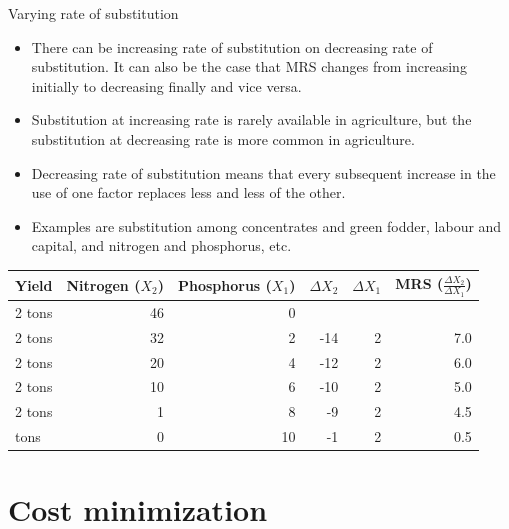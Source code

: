 \documentclass[12pt,ignorenonframetext,aspectratio=169]{beamer}
\providecommand{\tightlist}{%
  \setlength{\itemsep}{0pt}\setlength{\parskip}{0pt}}
\begin{document}
\begin{frame}{Varying rate of substitution}
\protect\hypertarget{varying-rate-of-substitution}{}
\begin{itemize}
\tightlist
\item
  There can be increasing rate of substitution on decreasing rate of
  substitution. It can also be the case that MRS changes from increasing
  initially to decreasing finally and vice versa.
\item
  Substitution at increasing rate is rarely available in agriculture,
  but the substitution at decreasing rate is more common in agriculture.
\item
  Decreasing rate of substitution means that every subsequent increase
  in the use of one factor replaces less and less of the other.
\item
  Examples are substitution among concentrates and green fodder, labour
  and capital, and nitrogen and phosphorus, etc.
\end{itemize}
\end{frame}

\begin{frame}{}
\protect\hypertarget{section-7}{}
\begin{table}[H]
\centering
\begin{tabular}{lrrrrr}
\toprule
Yield & Nitrogen ($X_2$) & Phosphorus ($X_1$) & $\Delta X_2$ & $\Delta X_1$ & MRS ($\frac{\Delta X_2}{\Delta X_1}$)\\
\midrule
\rowcolor{gray!6}  2 tons & 46 & 0 &  &  & \\
2 tons & 32 & 2 & -14 & 2 & 7.0\\
\rowcolor{gray!6}  2 tons & 20 & 4 & -12 & 2 & 6.0\\
2 tons & 10 & 6 & -10 & 2 & 5.0\\
\rowcolor{gray!6}  2 tons & 1 & 8 & -9 & 2 & 4.5\\
\addlinespace
2 tons & 0 & 10 & -1 & 2 & 0.5\\
\bottomrule
\end{tabular}
\end{table}
\end{frame}

\hypertarget{cost-minimization}{%
\section{Cost minimization}\label{cost-minimization}}
\end{document}
